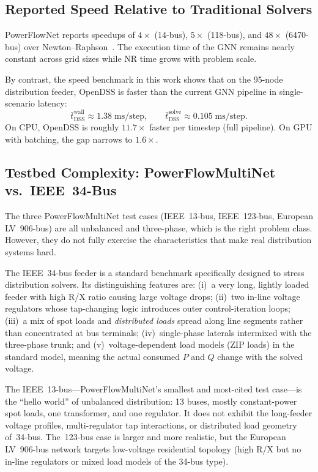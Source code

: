 \documentclass[11pt]{article}
\begin{document}
\subsection{Reported Speed Relative to Traditional Solvers}

PowerFlowNet reports speedups of $4\times$ (14-bus), $5\times$ (118-bus),
and $48\times$ (6470-bus) over Newton--Raphson~\cite{Lin2024}.  The
execution time of the GNN remains nearly constant across grid sizes while NR
time grows with problem scale.

By contrast, the speed benchmark in this work shows that on the 95-node
distribution feeder, OpenDSS is faster than the current GNN pipeline in
single-scenario latency:
\[
\bar t^{\text{wall}}_{\text{DSS}} \approx 1.38\;\text{ms/step},
\qquad
\bar t^{\text{solve}}_{\text{DSS}} \approx 0.105\;\text{ms/step}.
\]
On CPU, OpenDSS is roughly $11.7\times$ faster per timestep (full pipeline).
On GPU with batching, the gap narrows to $1.6\times$.

\subsection{Testbed Complexity: PowerFlowMultiNet vs.\ IEEE~34-Bus}

The three PowerFlowMultiNet test cases (IEEE~13-bus, IEEE~123-bus, European
LV~906-bus) are all unbalanced and three-phase, which is the right problem
class.  However, they do not fully exercise the characteristics that make
real distribution systems hard.

The IEEE~34-bus feeder is a standard benchmark specifically designed to stress
distribution solvers.  Its distinguishing features are: (i)~a very long,
lightly loaded feeder with high R/X ratio causing large voltage drops;
(ii)~two in-line voltage regulators whose tap-changing logic introduces outer
control-iteration loops; (iii)~a mix of spot loads and \emph{distributed
loads} spread along line segments rather than concentrated at bus terminals;
(iv)~single-phase laterals intermixed with the three-phase trunk; and
(v)~voltage-dependent load models (ZIP loads) in the standard model, meaning
the actual consumed $P$ and $Q$ change with the solved voltage.

The IEEE~13-bus---PowerFlowMultiNet's smallest and most-cited test case---is
the ``hello world'' of unbalanced distribution: 13 buses, mostly constant-power
spot loads, one transformer, and one regulator.  It does not exhibit the
long-feeder voltage profiles, multi-regulator tap interactions, or distributed
load geometry of~34-bus.  The~123-bus case is larger and more realistic, but
the European LV~906-bus network targets low-voltage residential topology
(high R/X but no in-line regulators or mixed load models of the 34-bus type).
\end{document}
